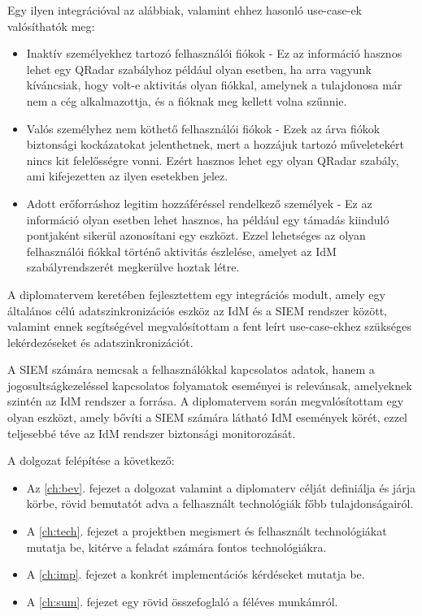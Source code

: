 Egy ilyen integrációval az alábbiak, valamint ehhez hasonló use-case-ek valósíthatók meg:

\begin{itemize}
	\item Inaktív személyekhez tartozó felhasználói fiókok - Ez az információ hasznos lehet egy QRadar szabályhoz például olyan esetben, ha arra vagyunk kíváncsiak, hogy volt-e aktivitás olyan fiókkal, amelynek a tulajdonosa már nem a cég alkalmazottja, és a fióknak meg kellett volna szűnnie.
	
	\item Valós személyhez nem köthető felhasználói fiókok - Ezek az árva fiókok biztonsági kockázatokat jelenthetnek, mert a hozzájuk tartozó műveletekért nincs kit felelősségre vonni. Ezért hasznos lehet egy olyan QRadar szabály, ami kifejezetten az ilyen esetekben jelez.
	
	\item Adott erőforráshoz legitim hozzáféréssel rendelkező személyek - Ez az információ olyan esetben lehet hasznos, ha például egy támadás kiinduló pontjaként sikerül azonosítani egy eszközt. Ezzel lehetséges az olyan felhasználói fiókkal történő aktivitás észlelése, amelyet az IdM szabályrendszerét megkerülve hoztak létre.
\end{itemize}

A diplomatervem keretében fejlesztettem egy integrációs modult, amely egy általános célú adatszinkronizációs eszköz az IdM és a SIEM rendszer között, valamint ennek segítségével megvalósítottam a fent leírt use-case-ekhez szükséges lekérdezéseket és adatszinkronizációt.

A SIEM számára nemcsak a felhasználókkal kapcsolatos adatok, hanem a jogosultságkezeléssel kapcsolatos folyamatok eseményei is relevánsak, amelyeknek szintén az IdM rendszer a forrása. A diplomatervem során megvalósítottam egy olyan eszközt, amely bővíti a SIEM számára látható IdM események körét, ezzel teljesebbé téve az IdM rendszer biztonsági monitorozását.

A dolgozat felépítése a következő:

\begin{itemize}
	\item Az \ref{ch:bev}. fejezet a dolgozat valamint a diplomaterv célját definiálja és járja körbe, rövid bemutatót adva a felhasznált technológiák főbb tulajdonságairól.
	
	\item A \ref{ch:tech}. fejezet a projektben megismert és felhasznált technológiákat mutatja be, kitérve a feladat számára fontos technológiákra.
	
	\item A \ref{ch:imp}. fejezet a konkrét implementációs kérdéseket mutatja be.
	
	\item A \ref{ch:sum}. fejezet egy rövid összefoglaló a féléves munkámról.
	
\end{itemize}

